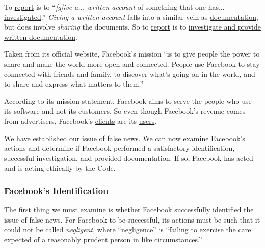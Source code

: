 \par To \ul{report} is to ``\emph{[g]ive a... written account} of something that one has... \ul{investigated}.'' \cite{oxford} \emph{Giving a written account} falls into a similar vein as \ul{documentation}, but does involve \emph{sharing} the documents. So to \ul{report} is to \ul{investigate and provide written documentation}.

\label{mission}

\par Taken from its official website, Facebook's mission ``is to give people the power to share and make the world more open and connected. People use Facebook to stay connected with friends and family, to discover what's going on in the world, and to share and express what matters to them.'' \cite{fb_newsroom}

\par According to its mission statement, Facebook aims to serve the people who use its software and not its customers. So even though Facebook's revenue comes from advertisers, \cite{fb_4q2016} Facebook's \ul{clients} are its \ul{users}.


\par We have established our issue of false news. We can now examine Facebook's actions and determine if Facebook performed a satisfactory identification, successful investigation, and provided documentation. If so, Facebook has acted and is acting ethically by the Code.

\subsubsection{Facebook's Identification}

\par The first thing we must examine is whether Facebook successfully identified the issue of false news. For Facebook to be successful, its actions must be such that it could not be called \emph{negligent}, where ``negligence'' is ``failing to exercise the care expected of a reasonably prudent person in like circumstances.'' \cite{merriam_webster}

